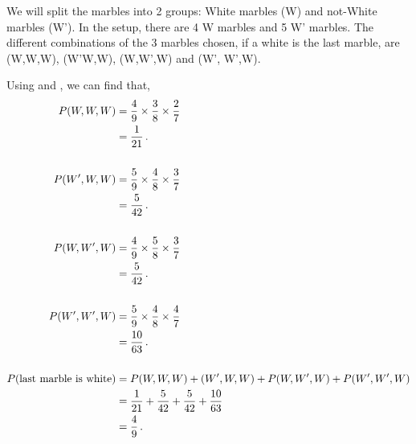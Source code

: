 \begin{subquestions}
\begin{subsubquestions}

\subsubquestion

We will split the marbles into 2 groups: White marbles (W) and not-White marbles (W'). In the setup, there are 4 W marbles and 5 W' marbles. The different combinations of the 3 marbles chosen, if a white is the last marble, are (W,W,W), (W'W,W), (W,W',W) and (W', W',W). 

Using  and , we can find that,
\begin{align}
	P(W,W,W) & = \frac{4}{9} \times \frac{3}{8} \times \frac{2}{7} \nonumber \\
	         & = \frac{1}{21} \,. \\ \nonumber \\
	P(W',W,W) & = \frac{5}{9} \times \frac{4}{8} \times \frac{3}{7} \nonumber \\
              & = \frac{5}{42} \,. \\ \nonumber \\
	P(W,W',W) & = \frac{4}{9} \times \frac{5}{8} \times \frac{3}{7} \nonumber \\
			  & = \frac{5}{42} \,. \\ \nonumber \\
	P(W',W',W)& = \frac{5}{9} \times \frac{4}{8} \times \frac{4}{7} \nonumber \\
			  & = \frac{10}{63} \,. \\ \nonumber \\
	P(\text{last marble is white}) & = P(W,W,W)+(W',W,W)+P(W,W',W)+P(W',W',W) \nonumber \\
	& = \frac{1}{21} + \frac{5}{42} + \frac{5}{42} + \frac{10}{63} \nonumber \\
	                               & = \frac{4}{9} \,.
\end{align}

\end{subsubquestions}

\end{subquestions}